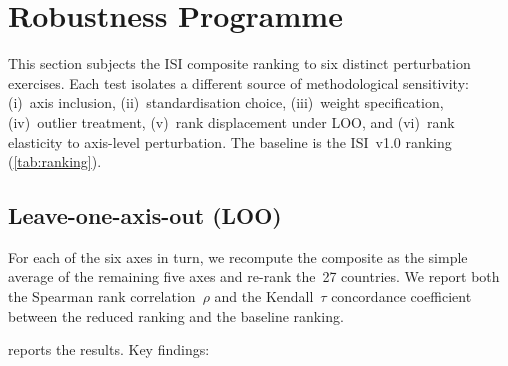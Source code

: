 \section{Robustness Programme}\label{sec:robustness}

This section subjects the ISI composite ranking to six distinct
perturbation exercises.  Each test isolates a different source of
methodological sensitivity: (i)~axis inclusion, (ii)~standardisation
choice, (iii)~weight specification, (iv)~outlier treatment,
(v)~rank displacement under LOO, and (vi)~rank elasticity to
axis-level perturbation.  The baseline is the ISI~v1.0 ranking
(\cref{tab:ranking}).

\subsection{Leave-one-axis-out (LOO)}\label{sec:loo}

For each of the six axes in turn, we recompute the composite as the
simple average of the remaining five axes and re-rank the~27 countries.
We report both the Spearman rank correlation~$\rho$ and the
Kendall~$\tau$ concordance coefficient between the reduced ranking
and the baseline ranking.



 reports the results.  Key findings:

